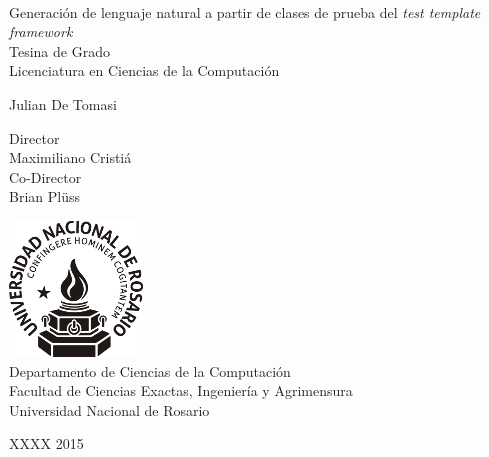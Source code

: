 \documentclass[spanish,11pt,a4paper]{memoir} %
\begin{document}
 

%
%
\thispagestyle{empty}

{%
\sffamily
\centering
\Large

~\vspace{\fill}

{\huge 
Generación de lenguaje natural a partir de clases de prueba del \textit{test template framework}
}\\[0.6em]
Tesina de Grado\\
Licenciatura en Ciencias de la Computación

\vspace{1.5cm}

{\LARGE
Julian De Tomasi
}

\vspace{1.5cm}

{\tiny Director}\\
Maximiliano Cristiá\\
{\tiny Co-Director}\\
Brian Plüss\\

\vspace{2.5cm}

\includegraphics[scale=0.8]{img/unr.png}\\
Departamento de Ciencias de la Computación\\
Facultad de Ciencias Exactas, Ingeniería y Agrimensura\\
Universidad Nacional de Rosario

\vspace{\fill}

XXXX 2015

}%

\cleardoublepage


\tableofcontents*


















\end{document}
